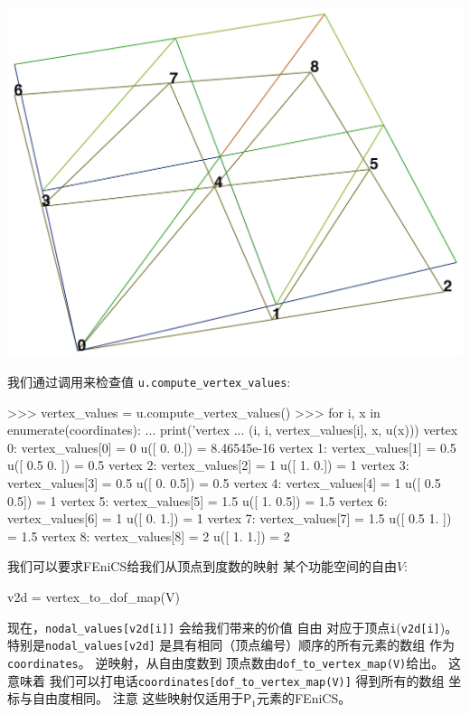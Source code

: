 \vspace{6mm}

\centerline{\includegraphics[width=0.75\linewidth]{fig/vertex_numbering.png}}

\vspace{6mm}


我们通过调用来检查值
\verb!u.compute_vertex_values!:

\begin{python}
>>> vertex_values = u.compute_vertex_values()
>>> for i, x in enumerate(coordinates):
...     print('vertex %
...           (i, i, vertex_values[i], x, u(x)))
vertex 0: vertex_values[0] = 0          u([ 0.  0.]) = 8.46545e-16
vertex 1: vertex_values[1] = 0.5        u([ 0.5  0. ]) = 0.5
vertex 2: vertex_values[2] = 1          u([ 1.  0.]) = 1
vertex 3: vertex_values[3] = 0.5        u([ 0.   0.5]) = 0.5
vertex 4: vertex_values[4] = 1          u([ 0.5  0.5]) = 1
vertex 5: vertex_values[5] = 1.5        u([ 1.   0.5]) = 1.5
vertex 6: vertex_values[6] = 1          u([ 0.  1.]) = 1
vertex 7: vertex_values[7] = 1.5        u([ 0.5  1. ]) = 1.5
vertex 8: vertex_values[8] = 2          u([ 1.  1.]) = 2
\end{python}


我们可以要求FEniCS给我们从顶点到度数的映射
某个功能空间的自由$V$:

\begin{python}
v2d = vertex_to_dof_map(V)
\end{python}
现在，\verb!nodal_values[v2d[i]]! 会给我们带来的价值
自由
对应于顶点\texttt{i}(\texttt{v2d[i]})。 特别是\verb!nodal_values[v2d]!
是具有相同（顶点编号）顺序的所有元素的数组
作为\texttt{coordinates}。 逆映射，从自由度数到
顶点数由\verb!dof_to_vertex_map(V)!给出。 这意味着
我们可以打电话\verb!coordinates[dof_to_vertex_map(V)]! 得到所有的数组
坐标与自由度相同。 注意
这些映射仅适用于$\mathsf{P}_1$元素的FEniCS。

